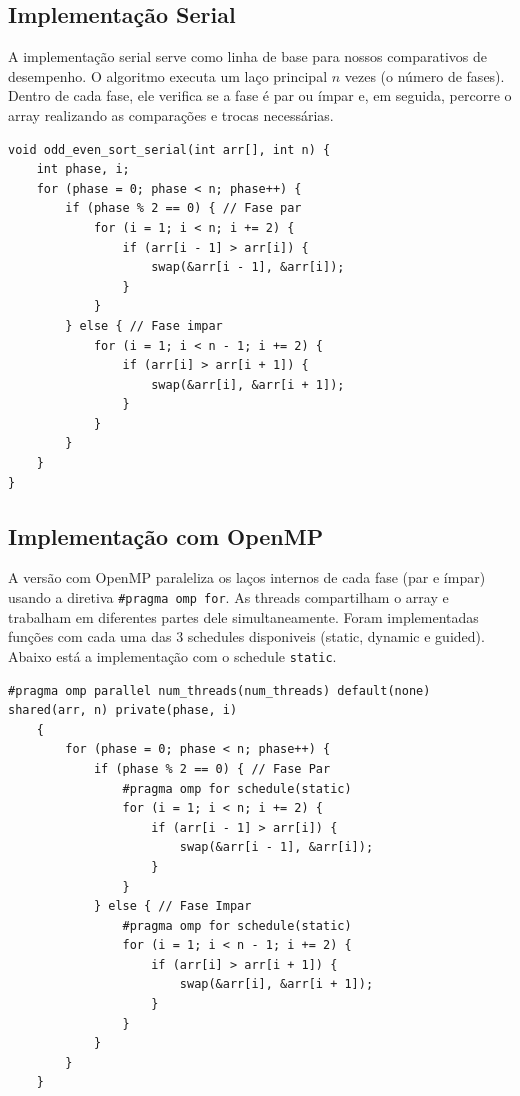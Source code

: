 \documentclass[12pt, a4paper]{article}
\begin{document}
\subsection{Implementação Serial}
A implementação serial serve como linha de base para nossos comparativos de desempenho. O algoritmo executa um laço principal $n$ vezes (o número de fases). Dentro de cada fase, ele verifica se a fase é par ou ímpar e, em seguida, percorre o array realizando as comparações e trocas necessárias.

\begin{lstlisting}[caption={Trecho do laço principal da versão serial.}, label=lst:serial]
void odd_even_sort_serial(int arr[], int n) {
    int phase, i;
    for (phase = 0; phase < n; phase++) {
        if (phase % 2 == 0) { // Fase par
            for (i = 1; i < n; i += 2) {
                if (arr[i - 1] > arr[i]) {
                    swap(&arr[i - 1], &arr[i]);
                }
            }
        } else { // Fase impar
            for (i = 1; i < n - 1; i += 2) {
                if (arr[i] > arr[i + 1]) {
                    swap(&arr[i], &arr[i + 1]);
                }
            }
        }
    }
}
\end{lstlisting}

\subsection{Implementação com OpenMP}
A versão com OpenMP paraleliza os laços internos de cada fase (par e ímpar) usando a diretiva \texttt{\#pragma omp for}. As threads compartilham o array e trabalham em diferentes partes dele simultaneamente. Foram implementadas funções com cada uma das 3 schedules disponiveis (static, dynamic e guided). Abaixo está a implementação com o schedule \texttt{static}.


\begin{lstlisting}[caption={Paralelização de uma fase com OpenMP.}, label=lst:openmp]
#pragma omp parallel num_threads(num_threads) default(none) shared(arr, n) private(phase, i)
    {
        for (phase = 0; phase < n; phase++) {
            if (phase % 2 == 0) { // Fase Par
                #pragma omp for schedule(static)
                for (i = 1; i < n; i += 2) {
                    if (arr[i - 1] > arr[i]) {
                        swap(&arr[i - 1], &arr[i]);
                    }
                }
            } else { // Fase Impar
                #pragma omp for schedule(static)
                for (i = 1; i < n - 1; i += 2) {
                    if (arr[i] > arr[i + 1]) {
                        swap(&arr[i], &arr[i + 1]);
                    }
                }
            }
        }
    }
\end{lstlisting}
\end{document}
